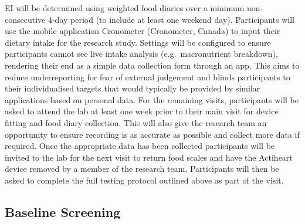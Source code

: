 \documentclass[
]{article}
\begin{document}
EI will be determined using weighted food diaries over a minimum non-consecutive 4-day period (to include at least one weekend day). Participants will use the mobile application Cronometer (Cronometer, Canada) to input their dietary intake for the research study. Settings will be configured to ensure participants cannot see live intake analysis (e.g.~macronutrient breakdown), rendering their end as a simple data collection form through an app. This aims to reduce underreporting for fear of external judgement and blinds participants to their individualised targets that would typically be provided by similar applications based on personal data. For the remaining visits, participants will be asked to attend the lab at least one week prior to their main visit for device fitting and food diary collection. This will also give the research team an opportunity to ensure recording is as accurate as possible and collect more data if required. Once the appropriate data has been collected participants will be invited to the lab for the next visit to return food scales and have the Actiheart device removed by a member of the research team. Participants will then be asked to complete the full testing protocol outlined above as part of the visit.

\subsection{Baseline Screening}\label{baseline-screening}
\end{document}
